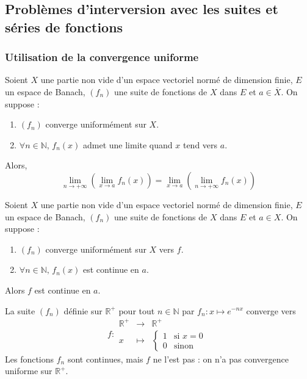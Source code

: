 



  \subsection{Problèmes d'interversion avec les suites et séries de fonctions}

  \subsubsection{Utilisation de la convergence uniforme}


  \begin{theorem}
    Soient $X$ une partie non vide d'un espace vectoriel normé de dimension finie, $E$ un espace de Banach, $(f_n)$ une suite de fonctions de $X$ dans $E$ et $a \in \overline{X}$. On suppose :
    \begin{enumerate}[label={\bfseries(\roman*)}]
      \item $(f_n)$ converge uniformément sur $X$.
      \item $\forall n \in \mathbb{N}, \, f_n(x)$ admet une limite quand $x$ tend vers $a$.
    \end{enumerate}
    Alors,
    \[ \lim_{n \rightarrow +\infty} \left( \lim_{x \rightarrow a} f_n(x) \right) = \lim_{x \rightarrow a} \left( \lim_{n \rightarrow +\infty} f_n(x) \right) \]
  \end{theorem}

  \begin{theorem}
    Soient $X$ une partie non vide d'un espace vectoriel normé de dimension finie, $E$ un espace de Banach, $(f_n)$ une suite de fonctions de $X$ dans $E$ et $a \in X$. On suppose :
    \begin{enumerate}[label={\bfseries(\roman*)}]
      \item $(f_n)$ converge uniformément sur $X$ vers $f$.
      \item $\forall n \in \mathbb{N}, \, f_n(x)$ est continue en $a$.
    \end{enumerate}
    Alors $f$ est continue en $a$.
  \end{theorem}

  \begin{example}
    La suite $(f_n)$ définie sur $\mathbb{R}^+$ pour tout $n \in \mathbb{N}$ par $f_n : x \mapsto e^{-nx}$ converge vers
    \[
      f :
      \begin{array}{ccc}
        \mathbb{R}^+ &\rightarrow& \mathbb{R}^+ \\
        x &\mapsto& \begin{cases}
          1 &\text{si } x = 0 \\
          0 &\text{sinon}
        \end{cases}
      \end{array}
    \]
    Les fonctions $f_n$ sont continues, mais $f$ ne l'est pas : on n'a pas convergence uniforme sur $\mathbb{R}^+$.
  \end{example}

